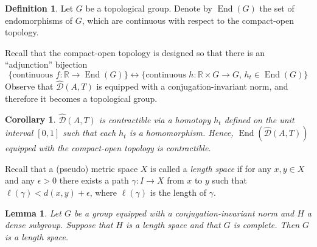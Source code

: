 \documentclass[12pt]{amsart}
\newtheorem{cor}[prop]{Corollary}
\newtheorem{lemma}[prop]{Lemma}
\theoremstyle{definition}
\newtheorem{defn}[prop]{Definition}
\def\RR{\ensuremath{\mathbb{R}}}
\def\End{\operatorname{End}}
\newcommand{\OP}[1]{\operatorname{#1}}
\def\D{\mathcal{D}}
\def\tD{\hat{\D}}
\begin{document}
\begin{defn}\label{def:End(G)}
Let $G$ be a topological group.
Denote by $\End(G)$ the set of endomorphisms of $G$, which are continuous
with respect to the compact-open topology.
\end{defn}

Recall that the compact-open topology is designed so that there is an ``adjunction'' bijection
\[
\{ \text{continuous $f \colon \RR \to \End(G)$}\} \leftrightarrow
\{ \text{continuous $h \colon \RR \times G \to G$,  $h_t \in \End(G)$}\}
\]
Observe that $\tD(A,T)$ is equipped with a conjugation-invariant norm, and therefore it becomes a topological group.


\begin{cor}\label{C:tDA is contractible in category of groups}
$\tD(A,T)$ is contractible via a homotopy $h_t$ defined on the unit interval $[0,1]$ such that each $h_t$ is a homomorphism.
Hence, $\OP{End}(\tD(A,T))$ equipped with the compact-open topology is contractible.
\end{cor}




Recall that a (pseudo) metric space $X$ is called a {\em length space} if for any $x,y \in X$ and any $\epsilon>0$ there exists a path $\gamma \colon I \to X$ from $x$ to $y$ such that $\ell(\gamma)<d(x,y)+\epsilon$, where $\ell(\gamma)$ is the length of $\gamma$.


\begin{lemma}\label{L:closure of length spaces}
Let $G$ be a group equipped with a conjugation-invariant norm and $H$ a dense subgroup.
Suppose that $H$ is a length space and that $G$ is complete.
Then $G$ is a length space.
\end{lemma}
\end{document}
